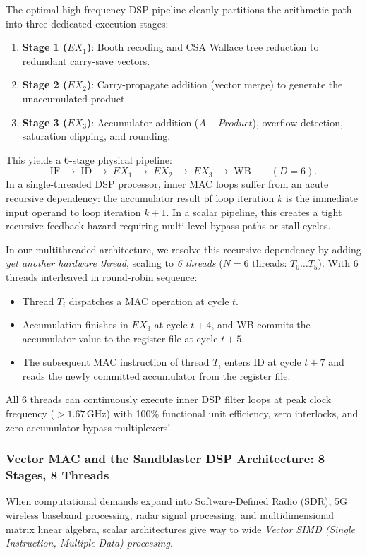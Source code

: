 The optimal high-frequency DSP pipeline cleanly partitions the arithmetic path into three dedicated execution stages:
\begin{enumerate}
    \item \textbf{Stage 1 ($EX_1$)}: Booth recoding and CSA Wallace tree reduction to redundant carry-save vectors.
    \item \textbf{Stage 2 ($EX_2$)}: Carry-propagate addition (vector merge) to generate the unaccumulated product.
    \item \textbf{Stage 3 ($EX_3$)}: Accumulator addition ($A + Product$), overflow detection, saturation clipping, and rounding.
\end{enumerate}
This yields a 6-stage physical pipeline:
\begin{equation}
\text{IF} \;\longrightarrow\; \text{ID} \;\longrightarrow\; EX_1 \;\longrightarrow\; EX_2 \;\longrightarrow\; EX_3 \;\longrightarrow\; \text{WB} \qquad (D = 6).
\end{equation}
In a single-threaded DSP processor, inner MAC loops suffer from an acute recursive dependency: the accumulator result of loop iteration $k$ is the immediate input operand to loop iteration $k+1$. In a scalar pipeline, this creates a tight recursive feedback hazard requiring multi-level bypass paths or stall cycles.

In our multithreaded architecture, we resolve this recursive dependency by adding \textit{yet another hardware thread}, scaling to \textit{6 threads} ($N = 6$ threads: $T_0 \dots T_5$). With 6 threads interleaved in round-robin sequence:
\begin{itemize}
    \item Thread $T_i$ dispatches a MAC operation at cycle $t$.
    \item Accumulation finishes in $EX_3$ at cycle $t+4$, and WB commits the accumulator value to the register file at cycle $t+5$.
    \item The subsequent MAC instruction of thread $T_i$ enters ID at cycle $t+7$ and reads the newly committed accumulator from the register file.
\end{itemize}
All 6 threads can continuously execute inner DSP filter loops at peak clock frequency ($>1.67\,\text{GHz}$) with 100\% functional unit efficiency, zero interlocks, and zero accumulator bypass multiplexers!

\subsubsection{Vector MAC and the Sandblaster DSP Architecture: 8 Stages, 8 Threads}
When computational demands expand into Software-Defined Radio (SDR), 5G wireless baseband processing, radar signal processing, and multidimensional matrix linear algebra, scalar architectures give way to wide \textit{Vector SIMD (Single Instruction, Multiple Data) processing}. 

